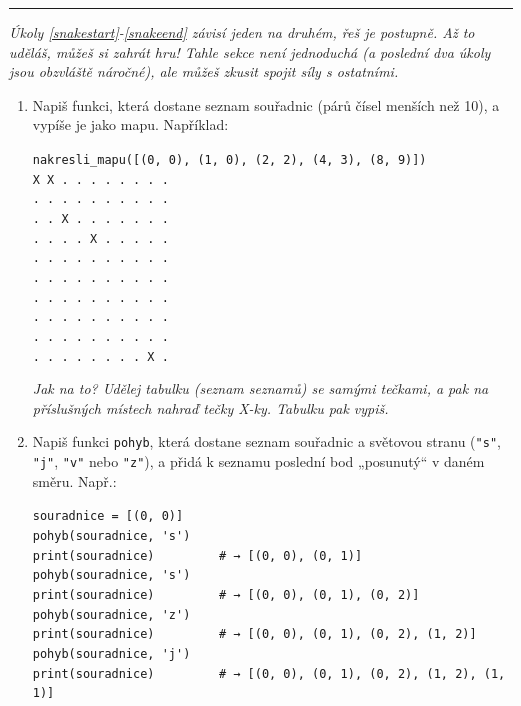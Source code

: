\documentclass[a4paper,10pt]{article}
\newcommand\startsection[1]{
     \vspace{0.2ex}
    \hrule
    {\fontspec{Oxygen} \tiny
     \vspace{-1ex}
     \emph{#1}
     \vspace{-1.5em}
    }
}
\begin{document}
\startsection{Úkoly \ref{snakestart}-\ref{snakeend} závisí jeden na druhém,
    řeš je postupně. Až to uděláš, můžeš si zahrát hru!
    Tahle sekce není jednoduchá (a poslední dva úkoly jsou obzvláště náročné),
    ale můžeš zkusit spojit síly s ostatními.}

\begin{enumerate}[resume]

\item \label{snakestart}
    Napiš funkci, která dostane seznam souřadnic (párů čísel menších než 10),
    a vypíše je jako mapu. Například:

\verb+nakresli_mapu([(0, 0), (1, 0), (2, 2), (4, 3), (8, 9)])+
\\\verb+X X . . . . . . . .+
\\\verb+. . . . . . . . . .+
\\\verb+. . X . . . . . . .+
\\\verb+. . . . X . . . . .+
\\\verb+. . . . . . . . . .+
\\\verb+. . . . . . . . . .+
\\\verb+. . . . . . . . . .+
\\\verb+. . . . . . . . . .+
\\\verb+. . . . . . . . . .+
\\\verb+. . . . . . . . X .+

    \emph{Jak na to?
        Udělej tabulku (seznam seznamů) se samými tečkami,
        a pak na příslušných místech nahraď tečky X-ky.
        Tabulku pak vypiš.}

\item Napiš funkci \verb+pohyb+, která dostane seznam souřadnic a světovou stranu
    (\verb+"s"+, \verb+"j"+, \verb+"v"+ nebo \verb+"z"+),
    a přidá k seznamu poslední bod „posunutý“ v daném směru. Např.:

  \verb+souradnice = [(0, 0)]+
\\\verb+pohyb(souradnice, 's')+
\\\verb+print(souradnice)         # → [(0, 0), (0, 1)]+
\\\verb+pohyb(souradnice, 's')+
\\\verb+print(souradnice)         # → [(0, 0), (0, 1), (0, 2)]+
\\\verb+pohyb(souradnice, 'z')+
\\\verb+print(souradnice)         # → [(0, 0), (0, 1), (0, 2), (1, 2)]+
\\\verb+pohyb(souradnice, 'j')+
\\\verb+print(souradnice)         # → [(0, 0), (0, 1), (0, 2), (1, 2), (1, 1)]+


\end{enumerate}
\end{document}
